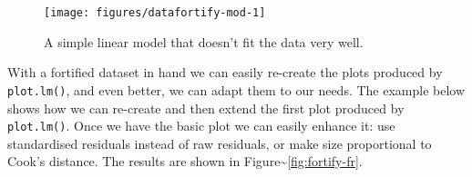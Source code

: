 \begin{Shaded}
\begin{Highlighting}[]
 \StringTok{ }\NormalTok{(} \NormalTok{)}
\StringTok{ }\StringTok{ } 
\end{Highlighting}
\end{Shaded}

\begin{figure}
\texttt{[image: figures/datafortify-mod-1]} \caption{A simple linear model that doesn't fit the data very well.\label{fig:fortify-mod}}
\end{figure}

With a fortified dataset in hand we can easily re-create the plots
produced by \texttt{plot.lm()}, and even better, we can adapt them to
our needs. The example below shows how we can re-create and then extend
the first plot produced by \texttt{plot.lm()}. Once we have the basic
plot we can easily enhance it: use standardised residuals instead of raw
residuals, or make size proportional to Cook's distance. The results are
shown in Figure\textasciitilde{}\ref{fig:fortify-fr}.

\begin{Shaded}
\begin{Highlighting}[]
\StringTok{ }\StringTok{ } 
\StringTok{ }
\StringTok{  }\NormalTok{(} \NormalTok{, } \NormalTok{, } \NormalTok{) +}\StringTok{ }
\StringTok{  }\NormalTok{() +}\StringTok{ }
\StringTok{  }\NormalTok{(} \NormalTok{, } 
\StringTok{ }\NormalTok{(} 
\StringTok{ }\NormalTok{(} \StringTok{ }\NormalTok{(}\NormalTok{)}
\end{Highlighting}
\end{Shaded}

